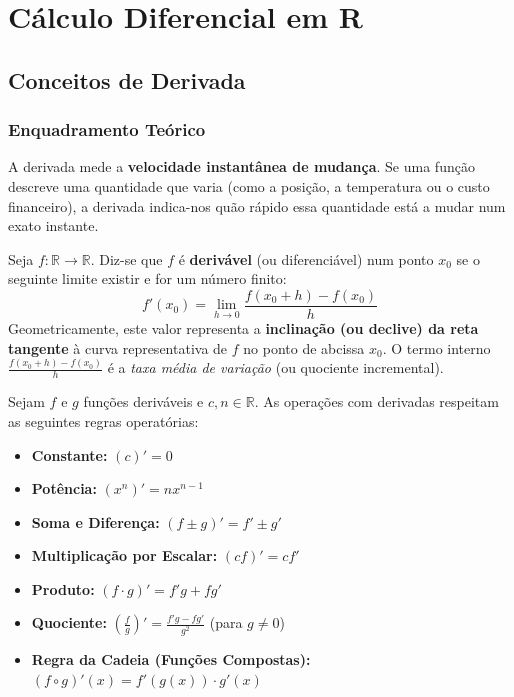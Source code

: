 
\chapter{Cálculo Diferencial em R}

\section{Conceitos de Derivada}

\subsection{Enquadramento Teórico}

\begin{notebox}[title={Intuição Essencial}]
  A derivada mede a \textbf{velocidade instantânea de mudança}. Se uma função descreve uma quantidade que varia (como a posição, a temperatura ou o custo financeiro), a derivada indica-nos quão rápido essa quantidade está a mudar num exato instante.
\end{notebox}

\begin{defbox}[title={Derivada de uma Função num Ponto}]
  Seja $f:\mathbb{R}\to\mathbb{R}$. Diz-se que $f$ é \textbf{derivável} (ou diferenciável) num ponto $x_0$ se o seguinte limite existir e for um número finito:
  \[
    f'(x_0) = \lim_{h\to 0} \frac{f(x_0+h)-f(x_0)}{h}
  \]
  Geometricamente, este valor representa a \textbf{inclinação (ou declive) da reta tangente} à curva representativa de $f$ no ponto de abcissa $x_0$. O termo interno $\frac{f(x_0+h)-f(x_0)}{h}$ é a \emph{taxa média de variação} (ou quociente incremental).
\end{defbox}

\begin{defbox}[title={Regras Fundamentais de Derivação}]
  Sejam $f$ e $g$ funções deriváveis e $c, n \in \mathbb{R}$. As operações com derivadas respeitam as seguintes regras operatórias:
  \begin{itemize}
      \item \textbf{Constante:} $(c)' = 0$
      \item \textbf{Potência:} $(x^n)' = n x^{n-1}$
      \item \textbf{Soma e Diferença:} $(f \pm g)' = f' \pm g'$
      \item \textbf{Multiplicação por Escalar:} $(cf)' = c f'$
      \item \textbf{Produto:} $(f \cdot g)' = f'g + f g'$
      \item \textbf{Quociente:} $\displaystyle \left(\frac{f}{g}\right)' = \frac{f'g - f g'}{g^2}$ \quad (para $g \neq 0$)
      \item \textbf{Regra da Cadeia (Funções Compostas):} $(f \circ g)'(x) = f'(g(x)) \cdot g'(x)$
  \end{itemize}
\end{defbox}

